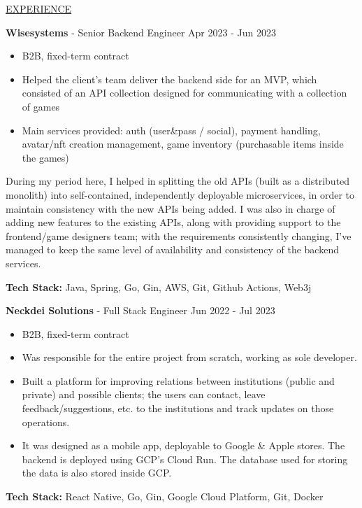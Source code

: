\documentclass[11pt]{article}
\newcommand{\betteruline}[1]{
    \uline{#1}
}
\newcommand{\sectiontitle}[1]{
    \begingroup
        \titlebold
        \betteruline{\Large\uppercase{#1}  }
        \vspace{1.7mm}
    \endgroup
}
\newcommand{\sectioncontent}[1]{
    \begingroup
        \begin{FlushLeft}
        \vspace{-3mm}
        \sffamily\small#1
        \end{FlushLeft}
    \endgroup
    \vspace{2mm}
}
\newcommand{\job}[3]{
    \begingroup
        \textbf{\small#1} - \small#2
        \hfill\color{black!70}\small{#3}
    \endgroup
}
\newcommand{\spacevv}{
    \vspace{2mm}
}
\begin{document}
\begin{paracol}{2}
    \switchcolumn
    \sectiontitle{experience}
    \sectioncontent{
      \job{Wisesystems}{Senior Backend Engineer}{Apr 2023 - Jun 2023}
      \begin{itemize}
          \item B2B, fixed-term contract
          \item Helped the client’s team deliver the backend side for an MVP, which consisted of an API collection designed for communicating with a collection of games
          \item Main services provided: auth (user&pass / social), payment handling, avatar/nft creation management, game inventory (purchasable items inside the games)
      \end{itemize}
      \item During my period here, I helped in splitting the old APIs (built as a               distributed monolith) into self-contained, independently deployable                 microservices, in order to maintain consistency with the new APIs being added.
            I was also in charge of adding new features to the existing APIs, along with providing support to the frontend/game designers team; with the requirements consistently changing, I’ve managed to keep the same level of availability and consistency of the backend services.
      \item \textbf{Tech Stack:} Java, Spring, Go, Gin, AWS, Git, Github Actions, Web3j
      \spacevv
      \spacevv
      \spacevv
      
      \job{Neckdei Solutions}{Full Stack Engineer}{Jun 2022 - Jul 2023}
      \begin{itemize}
          \item B2B, fixed-term contract
          \item Was responsible for the entire project from scratch, working as sole developer.
          \item Built a platform for improving relations between institutions (public and private) and possible clients; the users can contact, leave feedback/suggestions, etc. to the institutions and track updates on those operations.
          \item It was designed as a mobile app, deployable to Google \& Apple stores. The backend is deployed using GCP's Cloud Run. The database used for storing the data is also stored inside GCP.
      \end{itemize}
      \item \textbf{Tech Stack:} React Native, Go, Gin, Google Cloud Platform, Git, Docker
      \spacevv
      \spacevv
      \spacevv

}
\end{paracol}
\end{document}
